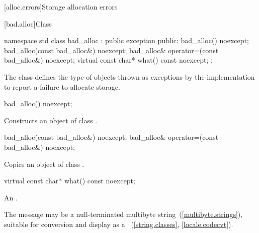[alloc.errors]{Storage allocation errors}

%
[bad.alloc]{Class }

\begin{codeblock}
namespace std {
  class bad_alloc : public exception {
  public:
    bad_alloc() noexcept;
    bad_alloc(const bad_alloc&) noexcept;
    bad_alloc& operator=(const bad_alloc&) noexcept;
    virtual const char* what() const noexcept;
  };
}
\end{codeblock}

\pnum
The class
defines the type of objects thrown as
exceptions by the implementation to report a failure to allocate storage.

%
\begin{itemdecl}
bad_alloc() noexcept;
\end{itemdecl}

\begin{itemdescr}
\pnum
\effects
Constructs an object of class
.
\end{itemdescr}

%
%
%
\begin{itemdecl}
bad_alloc(const bad_alloc&) noexcept;
bad_alloc& operator=(const bad_alloc&) noexcept;
\end{itemdecl}

\begin{itemdescr}
\pnum
\effects
Copies an object of class
.
\end{itemdescr}

%
\begin{itemdecl}
virtual const char* what() const noexcept;
\end{itemdecl}

\begin{itemdescr}
\pnum
\returns
{}%
An  \ntbs.

\pnum
\remarks
The message may be a null-terminated multibyte string~(\ref{multibyte.strings}),
suitable for conversion and display as a
~(\ref{string.classes}, \ref{locale.codecvt}).
\end{itemdescr}

